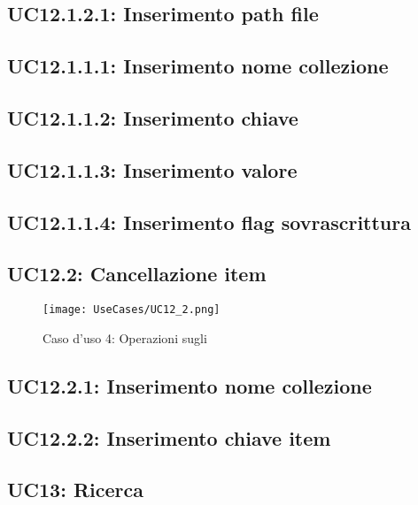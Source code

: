 \documentclass{scalatekids-article}
\begin{document}
\subsection{UC12.1.2.1: Inserimento path file}

\subsection{UC12.1.1.1: Inserimento nome collezione}

\subsection{UC12.1.1.2: Inserimento chiave}

\subsection{UC12.1.1.3: Inserimento valore}

\subsection{UC12.1.1.4: Inserimento flag sovrascrittura}

\subsection{UC12.2: Cancellazione item}

\begin{figure}[H]
  \begin{center}
    \texttt{[image: UseCases/UC12\_2.png]}
    \caption*{Caso d'uso 4: Operazioni sugli }
  \end{center}
\end{figure}

\subsection{UC12.2.1: Inserimento nome collezione}

\subsection{UC12.2.2: Inserimento chiave item}

\subsection{UC13: Ricerca}
\end{document}
